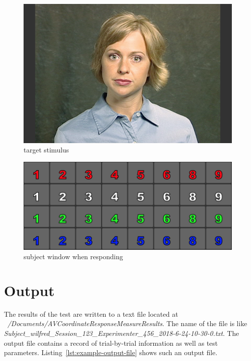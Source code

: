 \documentclass[11pt,pdftex,letterpaper]{article}
\begin{document}
\begin{figure}
\centering
\includegraphics[width = 0.9\linewidth]{target-stimulus.png}
\caption{target stimulus}
\label{fig:target-stimulus}
\end{figure}

\begin{figure}
\centering
\includegraphics[width = 0.9\linewidth]{subject-response-window.png}
\caption{subject window when responding}
\label{fig:subject-response-window}
\end{figure}

\section{Output}
The results of the test are written to a text file located at \textit{\string~/Documents/AVCoordinateResponseMeasureResults}. The name of the file is like \textit{Subject\_wilfred\_Session\_123\_Experimenter\_456\_2018-6-24-10-30-0.txt}. The output file contains a record of trial-by-trial information as well as test parameters. Listing~\ref{lst:example-output-file} shows such an output file.

\noindent\begin{minipage}{\textwidth}

\end{minipage}
\end{document}
